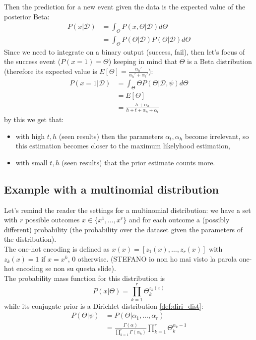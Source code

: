             Then the prediction for a new event given the data is the expected value of the posterior Beta:
            \begin{align*}
                P(x|\mathcal{D})    &= \int_\Theta P(x,\Theta|\mathcal{D})d\Theta\\
                                    &= \int_\Theta P(\Theta|\mathcal{D}) P(\Theta|\mathcal{D})d\Theta
            \end{align*}
            Since we need to integrate on a binary output (success, fail), then let's focus of the success event ($P(x=1) =\Theta$) keeping in mind that $\Theta$ is a Beta distribution (therefore its expected value is $E[\Theta] = \frac{\alpha_h '}{\alpha_h ' + \alpha_t '}$):
            \begin{align*}
                P(x = 1 | \mathcal{D}) & = \int_\Theta \Theta P(\Theta|\mathcal{D}, \psi) d\Theta\\
                &= E[\Theta]\\
                &= \frac{h + \alpha_h}{h + t + \alpha_h + \alpha_t}
            \end{align*}
            by this we get that: 
            \begin{itemize}
                \item with high $t, h$ (seen results) then the parameters $\alpha_t, \alpha_h$ become irrelevant, so this estimation becomes closer to the maximum likelyhood estimation,
                \item with small $t, h$ (seen results) that the prior estimate counts more.
            \end{itemize}
    
    \subsection{Example with a multinomial distribution}
        Let's remind the reader the settings for a multinomial distribution: we have a set with $r$ possible outcomes $x \in \{x^1, \dots, x^r\}$ and for each outcome a (possibly different) probability (the probability over the dataset given the parameters of the distribution).\\
        The one-hot encoding is defined as $x(x) = [z_1(x), \dots, z_r(x)]$ with $z_k(x) = 1$ if $x = x^k$, 0 otherwise. (STEFANO io non ho mai visto la parola one-hot encoding se non su questa slide).\\
        The probability mass function for this distribution is
        $$P(x|\Theta) = \prod_{k=1}^r \Theta_k^{z_k(x)}$$
        while its conjugate prior is a Dirichlet distribution \ref{def:diri_dist}:
        \begin{align*}
            P(\Theta|\psi)  &= P(\Theta|\alpha_1, \dots, \alpha_r)\\
                            &= \frac{\Gamma(\alpha)}{\prod_{k=1}^r \Gamma (\alpha_k)} \prod_{k=1}^r \Theta_k^{\alpha_k -1}
        \end{align*}
        
